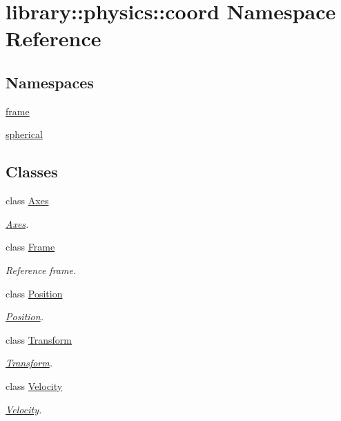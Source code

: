 \hypertarget{namespacelibrary_1_1physics_1_1coord}{}\section{library\+:\+:physics\+:\+:coord Namespace Reference}
\label{namespacelibrary_1_1physics_1_1coord}
\subsection*{Namespaces}
\begin{DoxyCompactItemize}
\item 
 \hyperlink{namespacelibrary_1_1physics_1_1coord_1_1frame}{frame}
\item 
 \hyperlink{namespacelibrary_1_1physics_1_1coord_1_1spherical}{spherical}
\end{DoxyCompactItemize}
\subsection*{Classes}
\begin{DoxyCompactItemize}
\item 
class \hyperlink{classlibrary_1_1physics_1_1coord_1_1_axes}{Axes}
\begin{DoxyCompactList}\small\item\em \hyperlink{classlibrary_1_1physics_1_1coord_1_1_axes}{Axes}. \end{DoxyCompactList}\item 
class \hyperlink{classlibrary_1_1physics_1_1coord_1_1_frame}{Frame}
\begin{DoxyCompactList}\small\item\em Reference frame. \end{DoxyCompactList}\item 
class \hyperlink{classlibrary_1_1physics_1_1coord_1_1_position}{Position}
\begin{DoxyCompactList}\small\item\em \hyperlink{classlibrary_1_1physics_1_1coord_1_1_position}{Position}. \end{DoxyCompactList}\item 
class \hyperlink{classlibrary_1_1physics_1_1coord_1_1_transform}{Transform}
\begin{DoxyCompactList}\small\item\em \hyperlink{classlibrary_1_1physics_1_1coord_1_1_transform}{Transform}. \end{DoxyCompactList}\item 
class \hyperlink{classlibrary_1_1physics_1_1coord_1_1_velocity}{Velocity}
\begin{DoxyCompactList}\small\item\em \hyperlink{classlibrary_1_1physics_1_1coord_1_1_velocity}{Velocity}. \end{DoxyCompactList}\end{DoxyCompactItemize}
